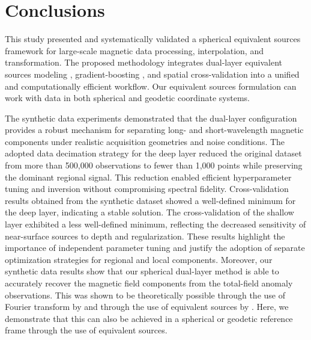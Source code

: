 \documentclass[a4paper,oneside,10pt]{book}
\begin{document}
\chapter{Conclusions}

This study presented and systematically validated a spherical equivalent
sources framework for large-scale magnetic data processing, interpolation, and
transformation. The proposed methodology integrates dual-layer equivalent
sources modeling \citep{Uppal2025}, gradient-boosting
\citep{Soler2021}, and spatial cross-validation into a unified and
computationally efficient workflow.
Our equivalent sources formulation can work with data in both spherical and
geodetic coordinate systems.

The synthetic data experiments demonstrated that the dual-layer configuration
provides a robust mechanism for separating long- and short-wavelength
magnetic components under realistic acquisition geometries and noise
conditions. The adopted data decimation strategy for the deep layer reduced
the original dataset from more than 500,000 observations to fewer than 1,000
points while preserving the dominant regional signal. This reduction enabled
efficient hyperparameter tuning and inversion without compromising spectral
fidelity.
Cross-validation results obtained from the synthetic dataset showed a
well-defined minimum for the deep layer, indicating a stable solution.
The cross-validation of the shallow layer
exhibited a less well-defined minimum, reflecting the decreased sensitivity of
near-surface sources to depth and regularization. These results highlight the
importance of independent parameter tuning and justify the adoption of separate
optimization strategies for regional and local components.
Moreover, our synthetic data results show that our spherical dual-layer method
is able to accurately recover the magnetic field components from the
total-field anomaly observations.
This was shown to be theoretically possible through the use of Fourier
transform by \citet{Lima2009} and through the use of equivalent sources by
\citet{Li2020}.
Here, we demonstrate that this can also be achieved in a spherical or geodetic
reference frame through the use of equivalent sources.
\end{document}
